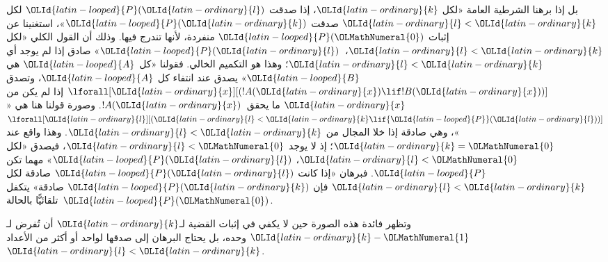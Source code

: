 \documentclass[../../../include/open-logic-section]{subfiles}
\begin{document}
بل إذا برهنا الشرطية العامة «لكل ${\OLId{latin-ordinary}{k}}$، إذا صدقت ${\OLId{latin-looped}{P}}({\OLId{latin-ordinary}{l}})$ لكل ${\OLId{latin-ordinary}{l}}<{\OLId{latin-ordinary}{k}}$
صدقت ${\OLId{latin-looped}{P}}({\OLId{latin-ordinary}{k}})$»، استغنينا عن إثبات ${\OLId{latin-looped}{P}}({\OLMathNumeral{0}})$ منفردة، لأنها تندرج فيها.
وذلك أن القول الكلي «لكل ${\OLId{latin-ordinary}{l}}<{\OLId{latin-ordinary}{k}}$،~${\OLId{latin-looped}{P}}({\OLId{latin-ordinary}{l}})$» صادق إذا لم يوجد أي ${\OLId{latin-ordinary}{l}}<{\OLId{latin-ordinary}{k}}$؛
وهذا هو التكميم الخالي. فقولنا «كل ${\OLId{latin-looped}{A}}$ هي ${\OLId{latin-looped}{B}}$» يصدق عند انتفاء كل
${\OLId{latin-looped}{A}}$، وتصدق $\lforall[{\OLId{latin-ordinary}{x}}][(!A({\OLId{latin-ordinary}{x}}) \lif !B({\OLId{latin-ordinary}{x}}))]$ إذا لم يكن من ${\OLId{latin-ordinary}{x}}$ ما
يحقق~$!A({\OLId{latin-ordinary}{x}})$. وصورة قولنا هنا هي
«$\lforall[{\OLId{latin-ordinary}{l}}][({\OLId{latin-ordinary}{l}} < {\OLId{latin-ordinary}{k}} \lif {\OLId{latin-looped}{P}}({\OLId{latin-ordinary}{l}}))]$»، وهي صادقة إذا خلا المجال من
${\OLId{latin-ordinary}{l}} < {\OLId{latin-ordinary}{k}}$. وهذا واقع عند ${\OLId{latin-ordinary}{k}}={\OLMathNumeral{0}}$؛ إذ لا يوجد ${\OLId{latin-ordinary}{l}}<{\OLMathNumeral{0}}$، فيصدق «لكل ${\OLId{latin-ordinary}{l}}<{\OLMathNumeral{0}}$،
${\OLId{latin-looped}{P}}({\OLId{latin-ordinary}{l}})$» مهما تكن ${\OLId{latin-looped}{P}}$. فبرهان «إذا كانت ${\OLId{latin-looped}{P}}({\OLId{latin-ordinary}{l}})$ صادقة لكل ${\OLId{latin-ordinary}{l}}<{\OLId{latin-ordinary}{k}}$ فإن
${\OLId{latin-looped}{P}}({\OLId{latin-ordinary}{k}})$ صادقة» يتكفل تلقائيًّا بالحالة~${\OLId{latin-looped}{P}}({\OLMathNumeral{0}})$.

وتظهر فائدة هذه الصورة حين لا يكفي في إثبات القضية لـ${\OLId{latin-ordinary}{k}}$ أن تُفرض
لـ${\OLId{latin-ordinary}{k}}-{\OLMathNumeral{1}}$ وحده، بل يحتاج البرهان إلى صدقها لواحد أو أكثر من الأعداد
${\OLId{latin-ordinary}{l}}<{\OLId{latin-ordinary}{k}}$.
\end{document}
